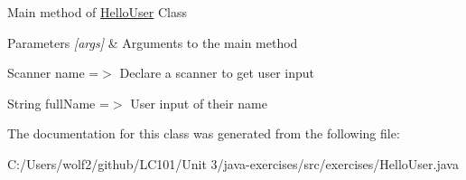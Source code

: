 Main method of \mbox{\hyperlink{classexercises_1_1_hello_user}{Hello\+User}} Class 
\begin{DoxyParams}{Parameters}
{\em \mbox{[}args\mbox{]}} & Arguments to the main method \\
\hline
\end{DoxyParams}
Scanner name =$>$ Declare a scanner to get user input

String full\+Name =$>$ User input of their name 

The documentation for this class was generated from the following file\+:\begin{DoxyCompactItemize}
\item 
C\+:/\+Users/wolf2/github/\+L\+C101/\+Unit 3/java-\/exercises/src/exercises/Hello\+User.\+java\end{DoxyCompactItemize}
